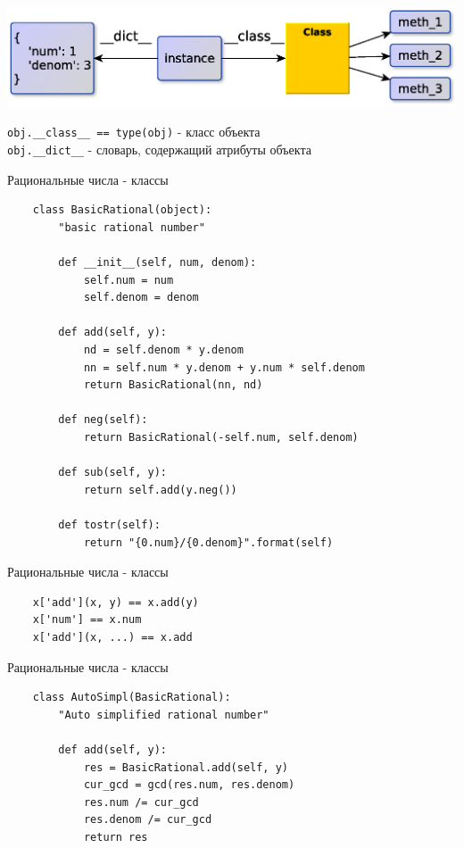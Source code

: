 \documentclass{article}
\begin{document}
\begin{center} \includegraphics[scale=0.8]{images/python_instance.eps} \end{center} 
\lstinline!obj.__class__ == type(obj)! - класс объекта \\
\lstinline!obj.__dict__! - словарь, содержащий атрибуты объекта
\newpage

\begin{center} Рациональные числа - классы \end{center}
\begin{lstlisting}
    class BasicRational(object):
        "basic rational number"

        def __init__(self, num, denom):
            self.num = num
            self.denom = denom

        def add(self, y):
            nd = self.denom * y.denom
            nn = self.num * y.denom + y.num * self.denom
            return BasicRational(nn, nd)

        def neg(self):
            return BasicRational(-self.num, self.denom)

        def sub(self, y):
            return self.add(y.neg())

        def tostr(self):
            return "{0.num}/{0.denom}".format(self)
\end{lstlisting}
\newpage

\begin{center} Рациональные числа - классы \end{center}
\begin{lstlisting}
    x['add'](x, y) == x.add(y)
    x['num'] == x.num
    x['add'](x, ...) == x.add
\end{lstlisting}
\newpage

\begin{center} Рациональные числа - классы \end{center}
\begin{lstlisting}
    class AutoSimpl(BasicRational):
        "Auto simplified rational number"

        def add(self, y):
            res = BasicRational.add(self, y)
            cur_gcd = gcd(res.num, res.denom)
            res.num /= cur_gcd
            res.denom /= cur_gcd
            return res
\end{lstlisting}
\newpage
\end{document}

